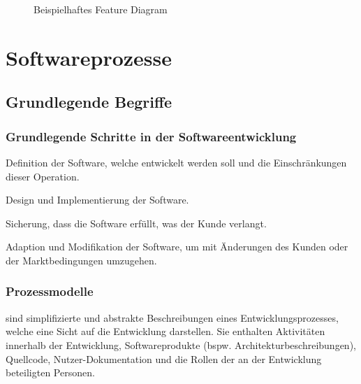 \documentclass[ngerman,color=3b]{tuda_summary}
\begin{document}
\begin{figure}[ht]
    \caption{Beispielhaftes Feature Diagram}
\end{figure}

\clearpage
\section{Softwareprozesse}
\subsection{Grundlegende Begriffe}
\subsubsection{Grundlegende Schritte in der Softwareentwicklung}
\begin{definition}
    Definition der Software, welche entwickelt werden soll und die Einschränkungen dieser Operation.
\end{definition}
\begin{definition}
    Design und Implementierung der Software.
\end{definition}
\begin{definition}
    Sicherung, dass die Software erfüllt, was der Kunde verlangt.
\end{definition}
\begin{definition}
    Adaption und Modifikation der Software, um mit Änderungen des Kunden oder der Marktbedingungen umzugehen.
\end{definition}

\subsubsection{Prozessmodelle}
\begin{definition}[Softwareprozessmodelle]
    sind simplifizierte und abstrakte Beschreibungen eines Entwicklungsprozesses, welche eine Sicht auf die Entwicklung darstellen. Sie enthalten Aktivitäten innerhalb der Entwicklung, Softwareprodukte (bspw. Architekturbeschreibungen), Quellcode, Nutzer-Dokumentation und die Rollen der an der Entwicklung beteiligten Personen.
\end{definition}
\end{document}
